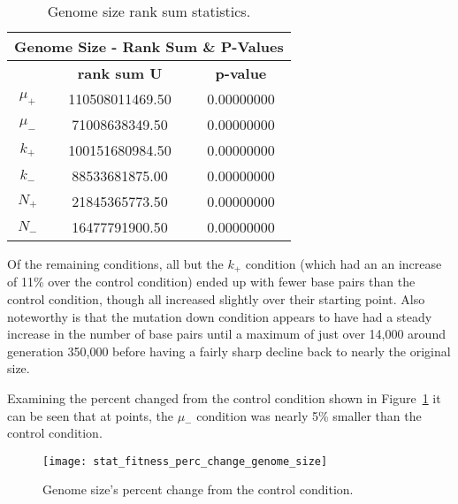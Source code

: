 \begin{table}[h]
	\centering
	\begin{tabular}{|c|c|c|}
		\hline
		\multicolumn{3}{c}{\Large Genome Size - Rank Sum \& P-Values} \\
		\hline
		& \textbf{rank sum U} & \textbf{p-value} \\
		\hline\hline
		$\mu_+$ & 110508011469.50 & 0.00000000 \\ 
		\hline
		$\mu_-$ & 71008638349.50 & 0.00000000 \\ 
		\hline
		$k_+$ & 100151680984.50 & 0.00000000 \\ 
		\hline
		$k_-$ & 88533681875.00 & 0.00000000 \\ 
		\hline
		$N_+$ & 21845365773.50 & 0.00000000 \\ 
		\hline
		$N_-$ & 16477791900.50 & 0.00000000 \\ 
		\hline
	\end{tabular}
	\caption[Genome size rank sum statistics]{Genome size rank sum statistics.}
	\label{table:genome_size_stats}
\end{table} 

Of the remaining conditions, all but the $k_+$ condition (which had an an increase of 11\% over the control condition) ended up with fewer base pairs than the control condition, though all increased slightly over their starting point. Also noteworthy is that the mutation down condition appears to have had a steady increase in the number of base pairs until a maximum of just over 14,000 around generation 350,000 before having a fairly sharp decline back to nearly the original size. 

Examining the percent changed from the control condition shown in Figure~\ref{fig:genome_size_percent_change} it can be seen that at points, the $\mu_-$ condition was nearly 5\% smaller than the control condition. 

\begin{figure}[H]
	\centering
	\texttt{[image: stat\_fitness\_perc\_change\_genome\_size]}
	\caption[Genome size - percent change]{Genome size's percent change from the control condition.}
	\label{fig:genome_size_percent_change}
\end{figure}

